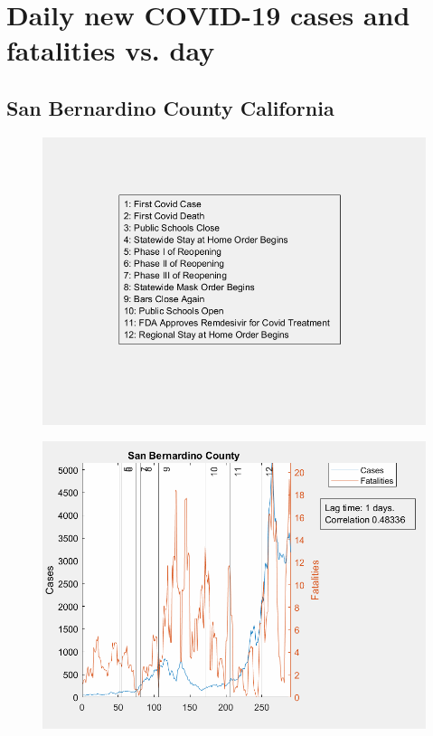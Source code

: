 \documentclass[12pt]{article}
\begin{document}
\FloatBarrier


\section{Daily new COVID-19 cases and fatalities vs. day}
\subsection[subtitle]{San Bernardino County California}


\begin{figure}[!h]
	\includegraphics[width=\linewidth]{legends/CaliforniaLegend.png}
	\caption{}
	\label{fig:legends/CaliforniaLegendLabel}
\end{figure}

\begin{figure}[!h]
	\includegraphics[width=\linewidth]{images/san_bernardino_cases_fatalities_line-1lag.png}
	\caption{}
	\label{fig:images/san_bernardino_cases_fatalities_line-1lagLabel}
\end{figure}
\end{document}
